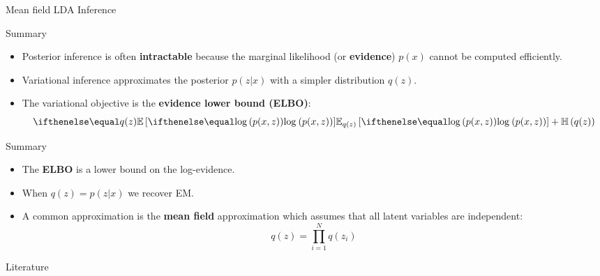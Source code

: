 \documentclass[14pt]{beamer}
\begin{document}
\begin{frame}{Mean field LDA Inference}
\begin{figure}
\end{figure}
\end{frame}

\begin{frame}{Summary}
\begin{itemize}
\item Posterior inference is often \textbf{intractable} because the marginal likelihood (or \textbf{evidence}) 
$ p(x) $ cannot be computed efficiently.
\item Variational inference approximates the posterior $ p(z|x) $ with a simpler distribution $ q(z) $.
\item The variational objective is the \textbf{evidence lower bound (ELBO)}:
\begin{equation*}
\E[q(z)]{\loga{p(x,z)}} + \Ent{q(z)}
\end{equation*}
\end{itemize}
\end{frame}

\begin{frame}{Summary}
\begin{itemize}
\item The \textbf{ELBO} is a lower bound on the log-evidence.
\item When $ q(z) = p(z|x) $ we recover EM.
\item A common approximation is the \textbf{mean field} approximation which assumes that all latent variables
are independent:
\begin{equation*}
q(z) = \prod_{i=1}^{N} q(z_{i})
\end{equation*}
\end{itemize}
\end{frame}

\nocite{BleiEtAl:2016}
\nocite{NealHinton:1998}
\nocite{GhahramaniJordan:1996}
\nocite{BleiEtAl:2003}

\begin{frame}[allowframebreaks]{Literature}

\small

\end{frame}
\end{document}
